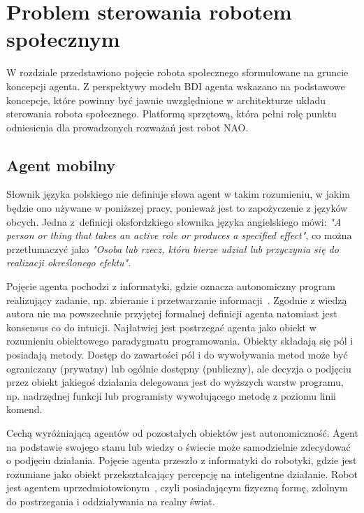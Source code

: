 \chapter{Problem sterowania robotem społecznym}
\label{chap:prob_ster_rob_spol}
W rozdziale przedstawiono pojęcie robota społecznego sformułowane na gruncie koncepcji agenta. Z perspektywy modelu BDI agenta wskazano na podstawowe koncepcje, które powinny być jawnie uwzględnione w architekturze układu sterowania robota społecznego. Platformą sprzętową, która pełni rolę punktu odniesienia dla prowadzonych rozważań jest robot NAO. 

\section{Agent mobilny}
\label{sec:agent}
Słownik języka polskiego nie definiuje słowa agent w takim rozumieniu, w jakim będzie ono używane w poniższej pracy, ponieważ jest to zapożyczenie z języków obcych. Jedna z~definicji oksfordzkiego słownika języka angielskiego mówi: \textit{"A person or thing that takes an active role or produces a specified effect"}\cite{OXFO}, co można przetłumaczyć jako \textit{"Osoba lub rzecz, która bierze udział lub przyczynia się do realizacji określonego efektu"}. 

Pojęcie agenta pochodzi z informatyki, gdzie oznacza autonomiczny program realizujący zadanie, np. zbieranie i przetwarzanie informacji~\cite{RAO, ZIEL}. Zgodnie z wiedzą autora nie ma powszechnie przyjętej formalnej definicji agenta natomiast jest konsensus co do intuicji. Najłatwiej jest postrzegać agenta jako obiekt w rozumieniu obiektowego paradygmatu programowania. Obiekty składają się pól i posiadają metody. Dostęp do zawartości pól i do wywoływania metod może być ograniczany (prywatny) lub ogólnie dostępny (publiczny), ale decyzja o podjęciu przez obiekt jakiegoś działania delegowana jest do wyższych warstw programu, np. nadrzędnej funkcji lub programisty wywołującego metodę z poziomu linii komend. 

Cechą wyróżniającą agentów od pozostałych obiektów jest autonomiczność. Agent na podstawie swojego stanu lub wiedzy o świecie może samodzielnie zdecydować o podjęciu działania. Pojęcie agenta przeszło z informatyki do robotyki, gdzie jest rozumiane jako obiekt przekształcający percepcję na inteligentne działanie. Robot jest agentem uprzedmiotowionym~\cite{ZIEL}, czyli posiadającym fizyczną formę, zdolnym do postrzegania i oddziaływania na realny świat.

